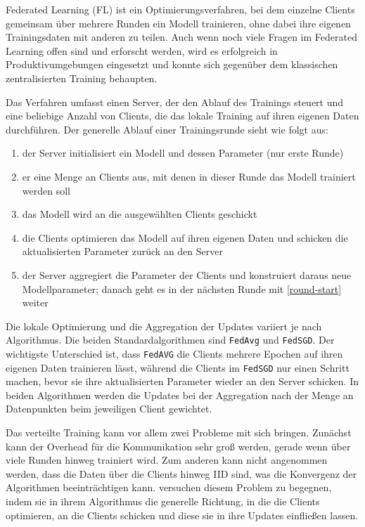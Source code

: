 Federated Learning (FL) ist ein Optimierungsverfahren, bei dem einzelne Clients gemeinsam über mehrere Runden ein Modell trainieren, ohne dabei ihre eigenen Trainingsdaten mit anderen zu teilen. Auch wenn noch viele Fragen im Federated Learning offen sind und erforscht werden, wird es erfolgreich in Produktivumgebungen eingesetzt und konnte sich gegenüber dem klassischen zentralisierten Training behaupten\cite{hard:2018, ramaswamy:2020}.

Das Verfahren umfasst einen Server, der den Ablauf des Trainings steuert und eine beliebige Anzahl von Clients, die das lokale Training auf ihren eigenen Daten durchführen. Der generelle Ablauf einer Trainingsrunde sieht wie folgt aus: 

\begin{enumerate}
	\item der Server initialisiert ein Modell und dessen Parameter (nur erste Runde) 
	\item \label{round-start} er eine Menge an Clients aus, mit denen in dieser Runde das Modell trainiert werden soll
	\item das Modell wird an die ausgewählten Clients geschickt
	\item die Clients optimieren das Modell auf ihren eigenen Daten und schicken die aktualisierten Parameter zurück an den Server
	\item der Server aggregiert die Parameter der Clients und konstruiert daraus neue Modellparameter; danach geht es in der nächsten Runde mit \autoref{round-start} weiter
\end{enumerate}

Die lokale Optimierung und die Aggregation der Updates variiert je nach Algorithmus. Die beiden Standardalgorithmen sind \texttt{FedAvg} und \texttt{FedSGD}\cite{mcmahan:2016}. Der wichtigste Unterschied ist, dass \texttt{FedAVG} die Clients mehrere Epochen auf ihren eigenen Daten trainieren lässt, während die Clients im \texttt{FedSGD} nur einen Schritt machen, bevor sie ihre aktualisierten Parameter wieder an den Server schicken. In beiden Algorithmen werden die Updates bei der Aggregation nach der Menge an Datenpunkten beim jeweiligen Client gewichtet.

Das verteilte Training kann vor allem zwei Probleme mit sich bringen. Zunächst kann der Overhead für die Kommunikation sehr groß werden, gerade wenn über viele Runden hinweg trainiert wird. Zum anderen kann nicht angenommen werden, dass die Daten über die Clients hinweg IID sind, was die Konvergenz der Algorithmen beeinträchtigen kann. \textcite{karimireddy:2020} versuchen diesem Problem zu begegnen, indem sie in ihrem Algorithmus die generelle Richtung, in die die Clients optimieren, an die Clients schicken und diese sie in ihre Updates einfließen lassen.

